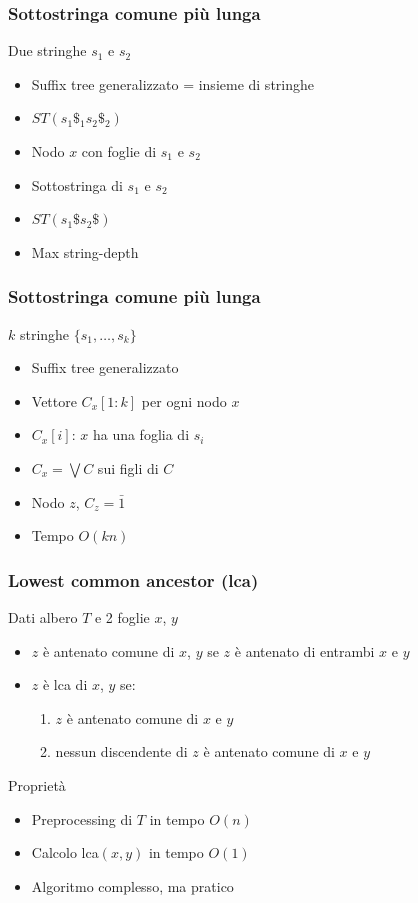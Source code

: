 \begin{frame}[fragile]
\frametitle{Sottostringa comune più lunga}
\begin{block}{Due stringhe $s_{1}$ e $s_{2}$}
\begin{itemize}
\item
Suffix tree generalizzato = insieme di stringhe
\item
$ST(s_{1}\$_{1}s_{2}\$_{2})$
\item
Nodo $x$ con foglie di $s_{1}$ e $s_{2}$
\item
Sottostringa di $s_{1}$ e $s_{2}$
\item
$ST(s_{1}\$s_{2}\$)$
\item
Max string-depth
\end{itemize}
\end{block}
\end{frame}

\begin{frame}[fragile]
\frametitle{Sottostringa comune più lunga}
\begin{block}{$k$ stringhe $\{s_{1}, \ldots , s_{k}\}$}
\begin{itemize}
\item
Suffix tree generalizzato
\item
Vettore $C_{x}[1:k]$ per ogni nodo $x$
\item
$C_{x}[i]$: $x$ ha una foglia di $s_{i}$
\item
$C_{x} = \bigvee C$ sui figli di $C$
\item
Nodo $z$, $C_{z}=\bar{1}$
\item
Tempo $O(kn)$
\end{itemize}
\end{block}
\end{frame}


\begin{frame}[fragile]
\frametitle{Lowest common ancestor (lca)}
\begin{block}{Dati albero $T$ e 2 foglie $x$, $y$}
\begin{itemize}
\item
$z$ è antenato comune di $x$, $y$ se
$z$ è antenato di entrambi $x$ e $y$
\item
$z$ è lca di $x$, $y$ se:
\begin{enumerate}
\item
$z$ è antenato comune di $x$ e $y$
\item
nessun discendente di $z$ è antenato comune di $x$ e $y$
\end{enumerate}
\end{itemize}
\end{block}
\begin{block}{Proprietà}
\begin{itemize}
\item
Preprocessing di $T$ in tempo $O(n)$
\item
Calcolo lca$(x,y)$ in tempo $O(1)$
\item
Algoritmo complesso, ma pratico
\end{itemize}
\end{block}
\end{frame}

